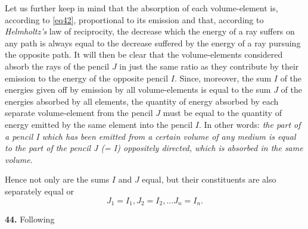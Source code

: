 \documentclass[12pt,oneside]{book}
\begin{document}
Let us further keep in mind that the absorption of each volume-element is, according to \eqref{eq42}, proportional to its emission and that, according to \textit{Helmholtz's} law of reciprocity, the decrease which the energy of a ray suffers on any path is always equal to the decrease suffered by the energy of a ray pursuing the opposite path. It will then be clear that the volume-elements considered absorb the rays of the pencil $J$ in just the same ratio as they contribute by their emission to
the energy of the opposite pencil $I$. Since, moreover, the sum $I$ of the energies given off by emission by all volume-elements is equal to the sum $J$ of the energies absorbed by all elements, the quantity of energy absorbed by each separate volume-element from the pencil $J$ must be equal to the quantity of energy emitted by the same element into the pencil $I$. In other words: \textit{the part of a pencil I which has been emitted from a certain volume of any medium is equal to the part of
the pencil J (= I) oppositely directed, which is absorbed in the same volume.} \par

Hence not only are the sums $I$ and $J$ equal, but their constituents are also separately equal or
\begin{equation}
    J_1=I_1, J_2=I_2, ... J_n=I_n.
    \label{eq46}
\end{equation} \par

\textbf{44.} Following
\end{document}
